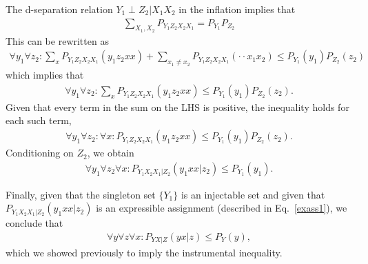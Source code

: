 \documentclass[aps,english,superscriptaddress,onecolumn,twoside,longbibliography,pra,floatfix,fleqn,nofootinbib]{revtex4-1}%
\theoremstyle{definition}
\begin{document}
The d-separation relation $Y_1 \perp Z_2 | X_1 X_2$ in the inflation implies that 
\begin{align}
\sum_{X_1,X_2}P_{Y_1 Z_2 X_2 X_1}  = P_{Y_1} P_{Z_2}
\end{align}
This can be rewritten as
\begin{align}
\forall  y_1 \forall z_2 : \sum_{x}P_{Y_1 Z_2 X_2 X_1} ( y_1 z_2 x x) + \sum_{x_1 \ne x_2}P_{Y_1 Z_2 X_2 X_1} ( \cdot \cdot x_1 x_2)  \le P_{Y_1}(y_1) P_{Z_2}(z_2)
\end{align}
which implies that
\begin{align}
\forall  y_1 \forall z_2 : \sum_{x}P_{Y_1 Z_2 X_2 X_1} ( y_1 z_2 x x)   \le P_{Y_1}(y_1) P_{Z_2}(z_2).
\end{align}
Given that every term in the sum on the LHS is positive, the inequality holds for each such term,
\begin{align}
\forall  y_1 \forall z_2 : \forall x: P_{Y_1 Z_2 X_2 X_1} ( y_1 z_2 x x)   \le P_{Y_1}(y_1) P_{Z_2}(z_2).
\end{align}
Conditioning on $Z_2$, we obtain
\begin{align}
\forall  y_1 \forall z_2 \forall x: P_{Y_1 X_2 X_1|Z_2 } ( y_1  x x|z_2 )   \le P_{Y_1}(y_1).
\end{align}

Finally, given that the singleton set $\{Y_1\}$ is an injectable set and given that $P_{Y_1 X_2 X_1|Z_2 } ( y_1  x x|z_2 ) $ is an expressible assignment (described in Eq.~\eqref{exass1}),  we conclude that
\begin{align}
\forall  y \forall z  \forall x: P_{Y X | Z } ( y x|z )   \le P_{Y}(y),
\end{align}
which we showed previously to imply the instrumental inequality.
\end{document}
